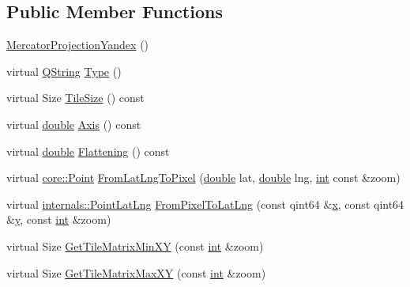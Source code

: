 \subsection*{Public Member Functions}
\begin{DoxyCompactItemize}
\item 
\hyperlink{group___o_p_map_widget_gaebc460c991ff6702512b15ff65b33ece}{Mercator\-Projection\-Yandex} ()
\item 
virtual \hyperlink{group___u_a_v_objects_plugin_gab9d252f49c333c94a72f97ce3105a32d}{Q\-String} \hyperlink{group___o_p_map_widget_gadfc14a9f761555a7472779402c2c0511}{Type} ()
\item 
virtual Size \hyperlink{group___o_p_map_widget_ga54a0f175ca8a37d62e27a2a7916ac6f9}{Tile\-Size} () const 
\item 
virtual \hyperlink{_super_l_u_support_8h_a8956b2b9f49bf918deed98379d159ca7}{double} \hyperlink{group___o_p_map_widget_ga8bcc6388e661bbc92a1fab57579f7364}{Axis} () const 
\item 
virtual \hyperlink{_super_l_u_support_8h_a8956b2b9f49bf918deed98379d159ca7}{double} \hyperlink{group___o_p_map_widget_gafc15feecfe2d4b87734d398f18a6903b}{Flattening} () const 
\item 
virtual \hyperlink{structcore_1_1_point}{core\-::\-Point} \hyperlink{group___o_p_map_widget_ga165e0f0502d73b38e1712e95eeaffb10}{From\-Lat\-Lng\-To\-Pixel} (\hyperlink{_super_l_u_support_8h_a8956b2b9f49bf918deed98379d159ca7}{double} lat, \hyperlink{_super_l_u_support_8h_a8956b2b9f49bf918deed98379d159ca7}{double} lng, \hyperlink{ioapi_8h_a787fa3cf048117ba7123753c1e74fcd6}{int} const \&zoom)
\item 
virtual \hyperlink{structinternals_1_1_point_lat_lng}{internals\-::\-Point\-Lat\-Lng} \hyperlink{group___o_p_map_widget_ga05a8dfb0d9ffc159da5776934f61d6ee}{From\-Pixel\-To\-Lat\-Lng} (const qint64 \&\hyperlink{glext_8h_a1db9d104e3c2128177f26aff7b46982f}{x}, const qint64 \&\hyperlink{glext_8h_a42315f3ed8fff752bb47fd782309fcfc}{y}, const \hyperlink{ioapi_8h_a787fa3cf048117ba7123753c1e74fcd6}{int} \&zoom)
\item 
virtual Size \hyperlink{group___o_p_map_widget_gae31d23a05a2c6771d8a5c2557d51f2dc}{Get\-Tile\-Matrix\-Min\-X\-Y} (const \hyperlink{ioapi_8h_a787fa3cf048117ba7123753c1e74fcd6}{int} \&zoom)
\item 
virtual Size \hyperlink{group___o_p_map_widget_ga7ecba9178be61022f6e533b06422a17e}{Get\-Tile\-Matrix\-Max\-X\-Y} (const \hyperlink{ioapi_8h_a787fa3cf048117ba7123753c1e74fcd6}{int} \&zoom)
\end{DoxyCompactItemize}
